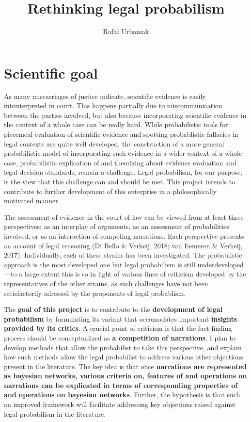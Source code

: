 \documentclass[11pt,dvipsnames,enabledeprecatedfontcommands]{scrartcl}
\title{Rethinking legal probabilism}
\author{Rafał Urbaniak}
\date{}
\begin{document}
\maketitle

\tableofcontents

\thispagestyle{empty}

\section{Scientific goal}\label{scientific-goal}

As many miscarriages of justice indicate, scientific evidence is easily
misinterpreted in court. This happens partially due to miscommunication
between the parties involved, but also because incorporating scientific
evidence in the context of a whole case can be really hard. While
probabilistic tools for piecemeal evaluation of scientific evidence and
spotting probablistic fallacies in legal contexts are quite well
developed,
the construction of a more general probabilistic model of incorporating
such evidence in a wider context of a whole case, probabilistic
explication of and theorizing about evidence evaluation and legal
decision standards, remain a challenge. Legal probabilism, for our
purpose, is the view that this challenge can and should be met. This
project intends to contribute to further development of this enterprise
in a philosophically motivated manner.

The assessment of evidence in the court of law can be viewed from at
least three perspectives: as an interplay of arguments, as an assessment
of probabilities involved, or as an interaction of competing narrations.
Each perspective presents an account of legal reasoning (Di Bello \&
Verheij, 2018; van Eemeren \& Verheij, 2017). Individually, each of
these strains has been investigated. The probablistic approach is the
most developed one but legal probabilism is still underdeveloped ---to a
large extent this is so in light of various lines of criticism developed
by the representatives of the other strains, as such challenges have not
been satisfactorily adressed by the proponents of legal probablism.

The \textbf{goal of this project} is to contribute to the
\textbf{development of legal probabilism} by formulating its variant
that accomodates important \textbf{insights provided by its critics}. A
crucial point of criticism is that the fact-finding process should be
conceptualized as \textbf{a competition of narrations}. I plan to
develop methods that allow the probabilist to take this perspective, and
explain how such methods allow the legal probabilist to address various
other objections present in the literature. The key idea is that once
\textbf{narrations are represented as bayesian networks, various criteria on,  features of  and operations on narrations can be explicated in terms of corresponding properties of and operations on bayesian networks}.
Further, the hypothesis is that such an improved framework will
facilitate addressing key objections raised against legal probabilism in
the literature.
\end{document}
